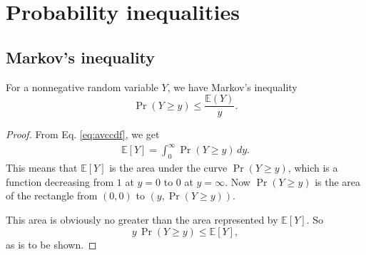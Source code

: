 \documentclass{article}
\begin{document}
\section{Probability inequalities}

\subsection{Markov's inequality}

For a nonnegative random variable $Y$, we have Markov's inequality
\begin{equation}
\operatorname{Pr}(Y\ge y) \le \frac{ \mathbb{E}(Y) } { y }.
\label{eq:markov_eq}
\end{equation}

\begin{proof}
From Eq. \eqref{eq:avccdf}, we get
$$
\begin{aligned}
\mathbb{E}[Y] = \int_0^\infty \operatorname{Pr}(Y \ge y) \, dy.
\end{aligned}
$$
This means that $\mathbb{E}[Y]$ is the area under the curve $\operatorname{Pr}(Y\ge y)$,
which is a function decreasing from $1$ at $y = 0$ to $0$ at $y = \infty$.
%
Now $\operatorname{Pr}(Y\ge y)$ is the area of the rectangle from $(0, 0)$
to $(y, \operatorname{Pr}(Y\ge y))$.
%
\begin{figure}[h]
  \centering
\end{figure}
%
This area is obviously no greater than the area represented by $\mathbb{E}[Y]$.
So
%
$$
y \, \operatorname{Pr}(Y \ge y) \le \mathbb{E}[Y],
$$
as is to be shown.
\end{proof}
\end{document}
